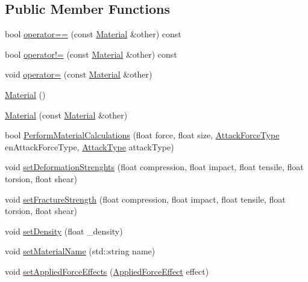 \subsection*{Public Member Functions}
\begin{DoxyCompactItemize}
\item 
bool \mbox{\hyperlink{class_material_acabed06a9ea9e7b8f56bd93785f81028}{operator==}} (const \mbox{\hyperlink{class_material}{Material}} \&other) const
\item 
bool \mbox{\hyperlink{class_material_a16d6175216c74057b2eab09ccaa7986c}{operator!=}} (const \mbox{\hyperlink{class_material}{Material}} \&other) const
\item 
void \mbox{\hyperlink{class_material_a0c841562a07082c43d64f7fa9477eb44}{operator=}} (const \mbox{\hyperlink{class_material}{Material}} \&other)
\item 
\mbox{\hyperlink{class_material_a137e987401b63eb7c6c27c3e38bc74b5}{Material}} ()
\item 
\mbox{\hyperlink{class_material_ac9b027e9c501776e7d08589a52e9d795}{Material}} (const \mbox{\hyperlink{class_material}{Material}} \&other)
\item 
bool \mbox{\hyperlink{class_material_a9340d9854962d09d685b9638be093fa5}{Perform\+Material\+Calculations}} (float force, float size, \mbox{\hyperlink{_enum_types_8hpp_ad893f9959c49f07fb713f13630b7ee2d}{Attack\+Force\+Type}} en\+Attack\+Force\+Type, \mbox{\hyperlink{_enum_types_8hpp_a904b2f9c8f3951116c343784c59d6afe}{Attack\+Type}} attack\+Type)
\item 
void \mbox{\hyperlink{class_material_a24b0f9d7ae4787f66ef055f70f63b240}{set\+Deformation\+Strenghts}} (float compression, float impact, float tensile, float torsion, float shear)
\item 
void \mbox{\hyperlink{class_material_a9c2547bdd4f225f9ad2351b8c2ad7c7e}{set\+Fracture\+Strength}} (float compression, float impact, float tensile, float torsion, float shear)
\item 
void \mbox{\hyperlink{class_material_ab7aca2e9daaf35b5b8a45ee677c07073}{set\+Density}} (float \+\_\+density)
\item 
void \mbox{\hyperlink{class_material_ab73b88e094cf38d28f9addfd12357b04}{set\+Material\+Name}} (std\+::string name)
\item 
void \mbox{\hyperlink{class_material_a0d32999bbe6a954cee51da67f78d5c51}{set\+Applied\+Force\+Effects}} (\mbox{\hyperlink{struct_applied_force_effect}{Applied\+Force\+Effect}} effect)
\item 

\end{DoxyCompactItemize}
